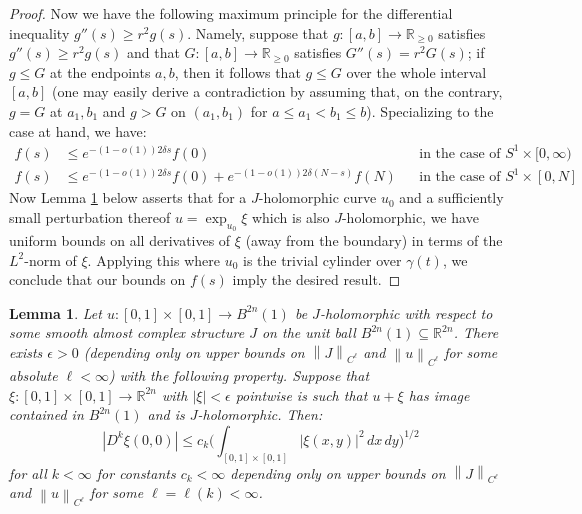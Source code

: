 \documentclass[12pt]{article}
\newtheorem{lemma}[theorem]{Lemma}
\theoremstyle{definition}
\theoremstyle{remark}
\numberwithin{equation}{subsection}
\newcommand{\RR}{\mathbb R}
\begin{document}
\begin{proof}
Now we have the following maximum principle for the differential inequality $g''(s)\geq r^2g(s)$.  Namely, suppose that $g:[a,b]\to\RR_{\geq 0}$ satisfies $g''(s)\geq r^2g(s)$ and that $G:[a,b]\to\RR_{\geq 0}$ satisfies $G''(s)=r^2G(s)$; if $g\leq G$ at the endpoints $a,b$, then it follows that $g\leq G$ over the whole interval $[a,b]$ (one may easily derive a contradiction by assuming that, on the contrary, $g=G$ at $a_1,b_1$ and $g>G$ on $(a_1,b_1)$ for $a\leq a_1<b_1\leq b$).  Specializing to the case at hand, we have:
\begin{align*}
f(s)&\leq e^{-(1-o(1))2\delta s}f(0)&&\text{in the case of }S^1\times[0,\infty)\\
f(s)&\leq e^{-(1-o(1))2\delta s}f(0)+e^{-(1-o(1))2\delta(N-s)}f(N)&&\text{in the case of }S^1\times[0,N]
\end{align*}
Now Lemma \ref{Ltwocontrolsinnbhd} below asserts that for a $J$-holomorphic curve $u_0$ and a sufficiently small perturbation thereof $u=\exp_{u_0}\xi$ which is also $J$-holomorphic, we have uniform bounds on all derivatives of $\xi$ (away from the boundary) in terms of the $L^2$-norm of $\xi$.  Applying this where $u_0$ is the trivial cylinder over $\gamma(t)$, we conclude that our bounds on $f(s)$ imply the desired result.
\end{proof}

\begin{lemma}\label{Ltwocontrolsinnbhd}
Let $u:[0,1]\times[0,1]\to B^{2n}(1)$ be $J$-holomorphic with respect to some smooth almost complex structure $J$ on the unit ball $B^{2n}(1)\subseteq\RR^{2n}$.  There exists $\epsilon>0$ (depending only on upper bounds on $\left\|J\right\|_{C^\ell}$ and $\left\|u\right\|_{C^\ell}$ for some absolute $\ell<\infty$) with the following property.  Suppose that $\xi:[0,1]\times[0,1]\to\RR^{2n}$ with $|\xi|<\epsilon$ pointwise is such that $u+\xi$ has image contained in $B^{2n}(1)$ and is $J$-holomorphic.  Then:
\begin{equation}
\left|D^k\xi(0,0)\right|\leq c_k\biggl(\int_{[0,1]\times[0,1]}\left|\xi(x,y)\right|^2\,dx\,dy\biggr)^{1/2}
\end{equation}
for all $k<\infty$ for constants $c_k<\infty$ depending only on upper bounds on $\left\|J\right\|_{C^\ell}$ and $\left\|u\right\|_{C^\ell}$ for some $\ell=\ell(k)<\infty$.
\end{lemma}
\end{document}
